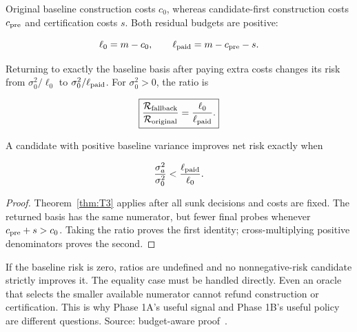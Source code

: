 \begin{proposition}\label{thm:T10}
Original baseline construction costs $c_0$, whereas candidate-first construction costs $c_{\rm pre}$ and certification costs $s$. Both residual budgets are positive:


\begin{equation}
\ell_0=m-c_0,\qquad \ell_{\rm paid}=m-c_{\rm pre}-s.
\end{equation}


Returning to exactly the baseline basis after paying extra costs changes its risk from $\sigma_0^2/\ell_0$ to $\sigma_0^2/\ell_{\rm paid}$. For $\sigma_0^2>0$, the ratio is


\begin{equation}
\boxed{\frac{\mathcal R_{\rm fallback}}{\mathcal R_{\rm original}}
=\frac{\ell_0}{\ell_{\rm paid}}.}
\end{equation}


A candidate with positive baseline variance improves net risk exactly when


\begin{equation}
\frac{\sigma_a^2}{\sigma_0^2}<\frac{\ell_{\rm paid}}{\ell_0}.
\end{equation}


\end{proposition}
\begin{proof}
Theorem~\ref{thm:T3} applies after all sunk decisions and costs are fixed. The returned basis has the same numerator, but fewer final probes whenever $c_{\rm pre}+s>c_0$. Taking the ratio proves the first identity; cross-multiplying positive denominators proves the second.

\end{proof}


If the baseline risk is zero, ratios are undefined and no nonnegative-risk candidate strictly improves it. The equality case must be handled directly. Even an oracle that selects the smaller available numerator cannot refund construction or certification. This is why Phase 1A's useful signal and Phase 1B's useful policy are different questions. Source: budget-aware proof~\cite{project2026}.

